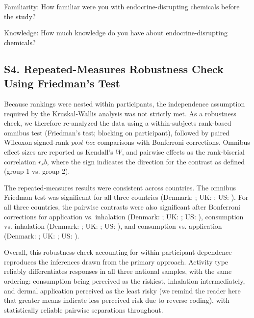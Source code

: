 Familiarity:
How familiar were you with endocrine-disrupting chemicals before the study?

Knowledge:
How much knowledge do you have about endocrine-disrupting chemicals?

\subsection{S4. Repeated-Measures Robustness Check Using Friedman's Test}
Because rankings were nested within participants, the independence assumption required by the Kruskal-Wallis analysis was not strictly met. As a robustness check, we therefore re-analyzed the data using a within-subjects rank-based omnibus test (Friedman's test; blocking on participant), followed by paired Wilcoxon signed-rank \textit{post hoc} comparisons with Bonferroni corrections. Omnibus effect sizes are reported as Kendall's $W$, and pairwise effects as the rank-biserial correlation $r_rb$, where the sign indicates the direction for the contrast as defined (group 1 vs. group 2).

The repeated-measures results were consistent across countries. The omnibus Friedman test was significant for all three countries (Denmark: ; UK: ; US: ). For all three countries, the pairwise contrasts were also significant after Bonferroni corrections for application vs. inhalation (Denmark: ;
UK: ;
US: ), consumption vs. inhalation (Denmark: ; 
UK: ;
US: ), and consumption vs. application 
(Denmark: ;
UK: ;
US: ).

Overall, this robustness check accounting for within-participant dependence reproduces the inferences drawn from the primary approach. Activity type reliably differentiates responses in all three national samples, with the same ordering: consumption being perceived as the riskiest, inhalation intermediately, and dermal application perceived as the least risky (we remind the reader here that greater means indicate less perceived risk due to reverse coding), with statistically reliable pairwise separations throughout.

